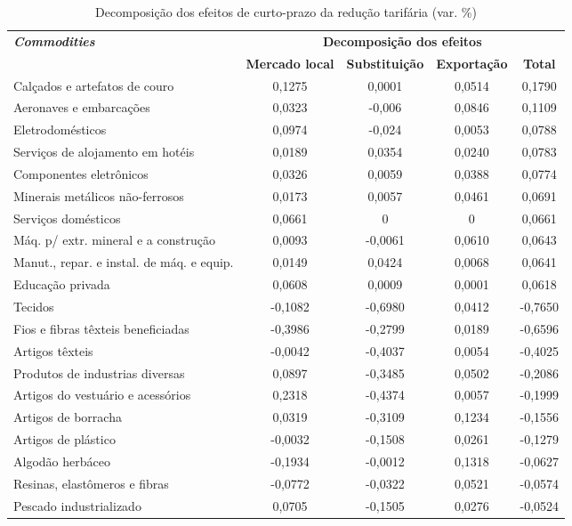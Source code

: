 \begin{table}[H]
	\centering
	\small
	\begin{threeparttable}
		\caption{Decomposição dos efeitos de curto-prazo da redução tarifária (var. \%)} \label{tab:fandecomp}
		\begin{tabular}{lcccc}
		\hline
		\multirow{2}{*}{\textit{\textbf{Commodities}}} &
		\multicolumn{4}{c}{\textbf{Decomposição dos efeitos}} \\ \cline{2-5} 
		&
		\multicolumn{1}{c}{\textbf{Mercado local}} &
		\multicolumn{1}{c}{\textbf{Substituição}} &
		\multicolumn{1}{c}{\textbf{Exportação}} &
		\multicolumn{1}{c}{\textbf{Total}} \\ \hline
		Calçados e artefatos de couro             & 0,1275  &  0,0001 &	0,0514	&  0,1790	\\	
        Aeronaves e embarcações                   & 0,0323  &  -0,006 &	0,0846	&  0,1109	\\	
		Eletrodomésticos                          & 0,0974  &  -0,024 &	0,0053	&  0,0788	\\	
		Serviços de alojamento em hotéis          & 0,0189  &  0,0354 &	0,0240	&  0,0783	\\	
		Componentes eletrônicos                   & 0,0326  &  0,0059 &	0,0388	&  0,0774	\\	
		Minerais metálicos não-ferrosos           & 0,0173  &  0,0057 &	0,0461	&  0,0691	\\	
		Serviços domésticos                       & 0,0661  &  0      &	0	    &  0,0661	\\	
		Máq. p/ extr. mineral e a construção      & 0,0093  & -0,0061 &	0,0610	&  0,0643	\\	
		Manut., repar. e instal. de máq. e equip. & 0,0149  &  0,0424 &	0,0068	&  0,0641	\\	
		Educação privada                          & 0,0608  &  0,0009 &	0,0001	&  0,0618	\\	\hline
		Tecidos                                   & -0,1082 & -0,6980 &	0,0412	& -0,7650	\\	
		Fios e fibras têxteis beneficiadas        & -0,3986 & -0,2799 &	0,0189	& -0,6596	\\	
		Artigos têxteis                           & -0,0042 & -0,4037 &	0,0054	& -0,4025	\\	
		Produtos de industrias diversas           & 0,0897	& -0,3485 &	0,0502	& -0,2086	\\	
		Artigos do vestuário e acessórios         & 0,2318	& -0,4374 &	0,0057	& -0,1999	\\	
		Artigos de borracha                       & 0,0319	& -0,3109 &	0,1234	& -0,1556	\\	
		Artigos de plástico                       & -0,0032 & -0,1508 &	0,0261	& -0,1279	\\	
		Algodão herbáceo                          & -0,1934 & -0,0012 &	0,1318	& -0,0627	\\	
		Resinas, elastômeros e fibras             & -0,0772 & -0,0322 &	0,0521	& -0,0574	\\	
		Pescado industrializado                   & 0,0705	& -0,1505 &	0,0276	& -0,0524	\\	\hline


\end{tabular}
\end{threeparttable}
\end{table}
